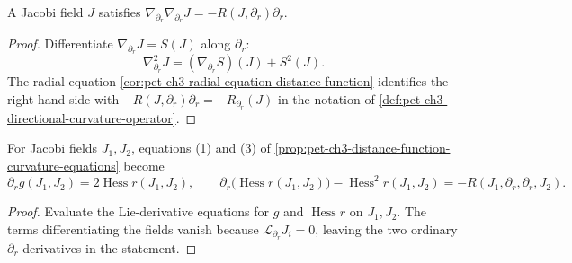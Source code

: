 \begin{proposition}
  \label{prop:pet-ch3-jacobi-second-order-equation}


  A Jacobi field $J$ satisfies $\nabla_{\partial_r}\nabla_{\partial_r}J=-R(J,\partial_r)\partial_r$.
\end{proposition}
\begin{proof}

  \sketch
  Differentiate $\nabla_{\partial_r}J=S(J)$ along $\partial_r$:
  \[
   \nabla_{\partial_r}^2J=(\nabla_{\partial_r}S)(J)+S^2(J).
  \]
  The radial equation \cref{cor:pet-ch3-radial-equation-distance-function}
  identifies the right-hand side with
  $-R(J,\partial_r)\partial_r=-R_{\partial_r}(J)$ in the notation of
  \cref{def:pet-ch3-directional-curvature-operator}.
\end{proof}

\begin{proposition}
  \label{prop:pet-ch3-jacobi-field-curvature-equations}


  For Jacobi fields $J_1,J_2$, equations (1) and (3) of
  \cref{prop:pet-ch3-distance-function-curvature-equations} become
  \[
    \partial_rg(J_1,J_2)=2\operatorname{Hess}r(J_1,J_2),\qquad
    \partial_r\big(\operatorname{Hess}r(J_1,J_2)\big)-\operatorname{Hess}^2r(J_1,J_2)=-R(J_1,\partial_r,\partial_r,J_2).
  \]
\end{proposition}
\begin{proof}

  \sketch
  Evaluate the Lie-derivative equations for $g$ and $\operatorname{Hess}r$ on
  $J_1,J_2$. The terms differentiating the fields vanish
  because $\mathcal L_{\partial_r}J_i=0$, leaving the two ordinary
  $\partial_r$-derivatives in the statement.
\end{proof}

